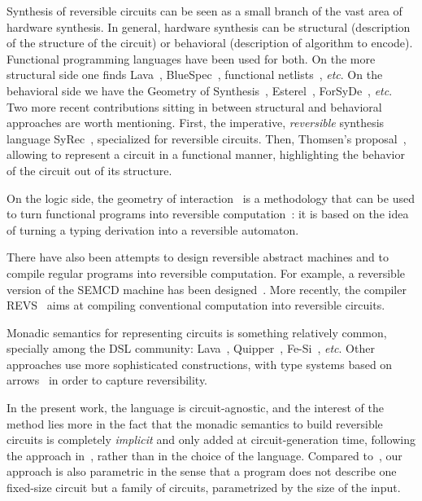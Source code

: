 \documentclass{article}
\theoremstyle{plain}
\theoremstyle{definition}
\begin{document}
Synthesis of reversible circuits can be seen as a small branch of the
vast area of hardware synthesis. In general, hardware synthesis can be
structural (description of the structure of the circuit) or behavioral
(description of algorithm to encode). Functional programming languages
have been used for both. On the more structural side one finds
Lava~\cite{Claessen-2001}, BlueSpec~\cite{bluespec}, functional
netlists~\cite{park08functional}, {\em etc}.  On the behavioral side
we have the Geometry of Synthesis~\cite{ghica07gos},
Esterel~\cite{esterel}, ForSyDe~\cite{forsyde}, {\em etc}. Two more
recent contributions sitting in between structural and behavioral
approaches are worth mentioning. First, the imperative, {\em
  reversible} synthesis language SyRec~\cite{syrec}, specialized for
reversible circuits. Then, Thomsen's proposal~\cite{thomsen}, allowing
to represent a circuit in a functional manner, highlighting
the behavior of the circuit out of its structure.

On the logic side, the geometry of interaction~\cite{goi} is a
methodology that can be used to turn functional programs into
reversible computation~\cite{abramsky,ghica07gos,terui}: it is based on
the idea of turning a typing derivation into a reversible automaton.

There have also been attempts to design reversible abstract machines
and to compile regular programs into reversible computation. For
example, a reversible version of the SEMCD machine has been
designed~\cite{kluge99}. More recently, the compiler REVS~\cite{revs}
aims at compiling conventional computation into reversible circuits.

Monadic semantics for representing circuits is something relatively
common, specially among the DSL community: Lava~\cite{Claessen-2001},
Quipper~\cite{PLDI}, Fe-Si~\cite{braibant13formal}, {\em etc}. Other
approaches use more sophisticated constructions, with type systems
based on arrows~\cite{James} in order to capture reversibility. 

In the present work, the language is circuit-agnostic, and the
interest of the method lies more in the fact that the monadic
semantics to build reversible circuits is completely {\em implicit}
and only added at circuit-generation time, following the approach
in~\cite{MLmonad}, rather than in the choice of the language. Compared
to~\cite{James}, our approach is also parametric in the sense that a
program does not describe one fixed-size circuit but a family of
circuits, parametrized by the size of the input.
\end{document}
